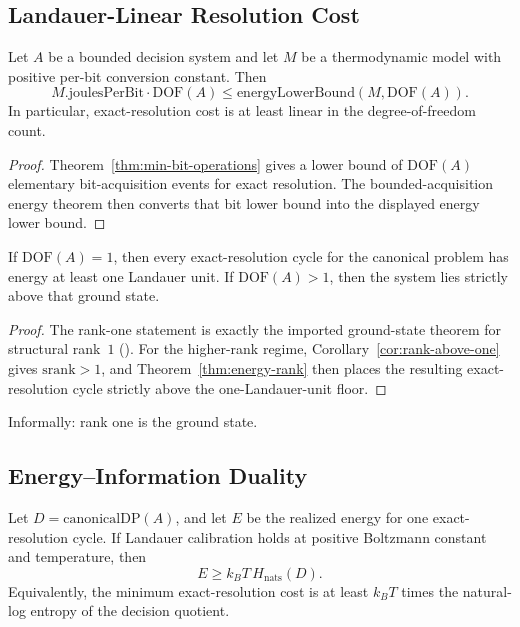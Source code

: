 \subsection{Landauer-Linear Resolution Cost}

\begin{theorem}\label{thm:energy-rank}
Let $A$ be a bounded decision system and let $M$ be a thermodynamic model with positive per-bit conversion constant. Then
\[
M.\mathrm{joulesPerBit} \cdot \mathrm{DOF}(A)
\le
\mathrm{energyLowerBound}(M, \mathrm{DOF}(A)).
\]
In particular, exact-resolution cost is at least linear in the degree-of-freedom count.
\end{theorem}

\begin{proof}
Theorem~\ref{thm:min-bit-operations} gives a lower bound of $\mathrm{DOF}(A)$ elementary bit-acquisition events for exact resolution. The bounded-acquisition energy theorem then converts that bit lower bound into the displayed energy lower bound.
\end{proof}

\begin{theorem}\label{thm:rank-one-ground}
If $\mathrm{DOF}(A)=1$, then every exact-resolution cycle for the canonical problem has energy at least one Landauer unit. If $\mathrm{DOF}(A)>1$, then the system lies strictly above that ground state.
\end{theorem}

\begin{proof}
The rank-one statement is exactly the imported ground-state theorem for structural rank~$1$ (). For the higher-rank regime, Corollary~\ref{cor:rank-above-one} gives $\mathrm{srank}>1$, and Theorem~\ref{thm:energy-rank} then places the resulting exact-resolution cycle strictly above the one-Landauer-unit floor.
\end{proof}

Informally: rank one is the ground state.

\subsection{Energy--Information Duality}

\begin{theorem}\label{thm:energy-entropy}
Let $D = \mathrm{canonicalDP}(A)$, and let $E$ be the realized energy for one exact-resolution cycle. If Landauer calibration holds at positive Boltzmann constant and temperature, then
\[
E \ge k_B T\, H_{\mathrm{nats}}(D).
\]
Equivalently, the minimum exact-resolution cost is at least $k_B T$ times the natural-log entropy of the decision quotient.
\end{theorem}


